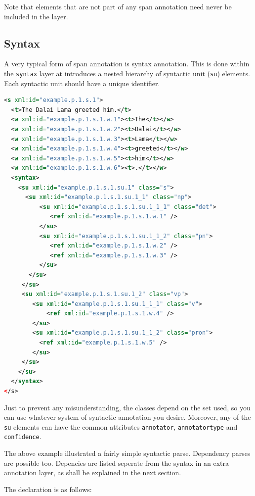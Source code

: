 \documentclass[a4paper,12pt]{report}
\begin{document}
Note that elements that are not part of any span annotation need never be included in the layer.

\subsection{Syntax}

A very typical form of span annotation is syntax annotation. This is done within the \texttt{syntax} layer at introduces a nested hierarchy of syntactic unit (\texttt{su}) elements. Each syntactic unit should have a unique identifier.

\begin{lstlisting}[language=xml]
<s xml:id="example.p.1.s.1">
  <t>The Dalai Lama greeted him.</t>
  <w xml:id="example.p.1.s.1.w.1"><t>The</t></w>
  <w xml:id="example.p.1.s.1.w.2"><t>Dalai</t></w>
  <w xml:id="example.p.1.s.1.w.3"><t>Lama</t></w>
  <w xml:id="example.p.1.s.1.w.4"><t>greeted</t></w>
  <w xml:id="example.p.1.s.1.w.5"><t>him</t></w>
  <w xml:id="example.p.1.s.1.w.6"><t>.</t></w>
  <syntax>
    <su xml:id="example.p.1.s.1.su.1" class="s">     
      <su xml:id="example.p.1.s.1.su.1_1" class="np">
          <su xml:id="example.p.1.s.1.su.1_1_1" class="det">
             <ref xml:id="example.p.1.s.1.w.1" />       
          </su>
          <su xml:id="example.p.1.s.1.su.1_1_2" class="pn">
             <ref xml:id="example.p.1.s.1.w.2" />
             <ref xml:id="example.p.1.s.1.w.3" />        
          </su>         
       </su>
     </su>
     <su xml:id="example.p.1.s.1.su.1_2" class="vp"> 
        <su xml:id="example.p.1.s.1.su.1_1_1" class="v">
            <ref xml:id="example.p.1.s.1.w.4" />       
        </su>
        <su xml:id="example.p.1.s.1.su.1_1_2" class="pron">
          <ref xml:id="example.p.1.s.1.w.5" />       
        </su>
     </su>    
    </su>
  </syntax>
</s>
\end{lstlisting}

Just to prevent any misunderstanding, the classes depend on the set used, so you can use whatever system of syntactic annotation you desire. Moreover, any of the \texttt{su} elements can have the common attributes \texttt{annotator}, \texttt{annotatortype} and \texttt{confidence}.


The above example illustrated a fairly simple syntactic parse. Dependency parses are possible too. Depencies are listed seperate from the syntax in an extra annotation layer, as shall be explained in the next section.

The declaration is as follows:
\end{document}
